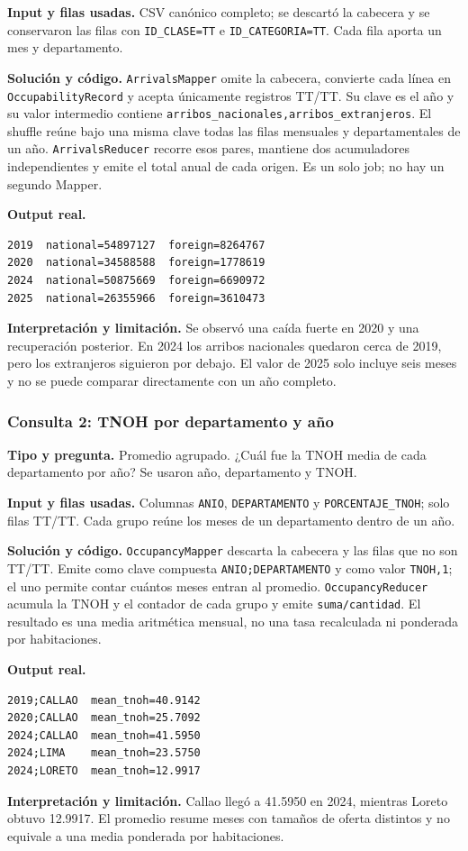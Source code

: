 \documentclass[10pt,a4paper]{article}
\theoremstyle{definition}
\begin{document}
\textbf{Input y filas usadas.} CSV canónico completo; se descartó la cabecera y
se conservaron las filas con \texttt{ID\_CLASE=TT} e
\texttt{ID\_CATEGORIA=TT}. Cada fila aporta un mes y departamento.

\textbf{Solución y código.} \texttt{ArrivalsMapper} omite la cabecera, convierte
cada línea en \texttt{OccupabilityRecord} y acepta únicamente registros TT/TT.
Su clave es el año y su valor intermedio contiene
\texttt{arribos\_nacionales,arribos\_extranjeros}. El shuffle reúne bajo una
misma clave todas las filas mensuales y departamentales de un año.
\texttt{ArrivalsReducer} recorre esos pares, mantiene dos acumuladores
independientes y emite el total anual de cada origen. Es un solo job; no hay un
segundo Mapper.

\textbf{Output real.}
\begin{lstlisting}[style=resultado]
2019  national=54897127  foreign=8264767
2020  national=34588588  foreign=1778619
2024  national=50875669  foreign=6690972
2025  national=26355966  foreign=3610473
\end{lstlisting}
\textbf{Interpretación y limitación.} Se observó una caída fuerte en 2020 y una
recuperación posterior. En 2024 los arribos nacionales quedaron cerca de 2019,
pero los extranjeros siguieron por debajo. El valor de 2025 solo incluye seis
meses y no se puede comparar directamente con un año completo.

\subsubsection{Consulta 2: TNOH por departamento y año}
\textbf{Tipo y pregunta.} Promedio agrupado. ¿Cuál fue la TNOH media de cada
departamento por año? Se usaron año, departamento y TNOH.

\textbf{Input y filas usadas.} Columnas \texttt{ANIO}, \texttt{DEPARTAMENTO} y
\texttt{PORCENTAJE\_TNOH}; solo filas TT/TT. Cada grupo reúne los meses de un
departamento dentro de un año.

\textbf{Solución y código.} \texttt{OccupancyMapper} descarta la cabecera y las
filas que no son TT/TT. Emite como clave compuesta
\texttt{ANIO;DEPARTAMENTO} y como valor \texttt{TNOH,1}; el uno permite contar
cuántos meses entran al promedio. \texttt{OccupancyReducer} acumula la TNOH y
el contador de cada grupo y emite \texttt{suma/cantidad}. El resultado es una
media aritmética mensual, no una tasa recalculada ni ponderada por habitaciones.

\textbf{Output real.}
\begin{lstlisting}[style=resultado]
2019;CALLAO  mean_tnoh=40.9142
2020;CALLAO  mean_tnoh=25.7092
2024;CALLAO  mean_tnoh=41.5950
2024;LIMA    mean_tnoh=23.5750
2024;LORETO  mean_tnoh=12.9917
\end{lstlisting}
\textbf{Interpretación y limitación.} Callao llegó a 41.5950 en 2024, mientras
Loreto obtuvo 12.9917. El promedio resume meses con tamaños de oferta distintos
y no equivale a una media ponderada por habitaciones.
\end{document}
